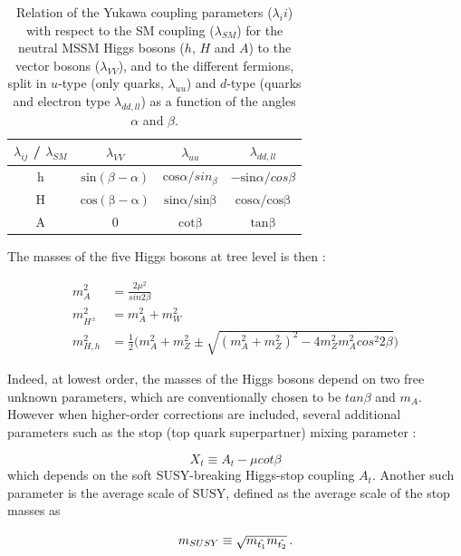 \begin{table}[]
    \centering
    \begin{tabular}{c c c c}
        $\lambda_{ij}$ / $\lambda_{SM}$ & $\lambda_{VV}$ & $\lambda_{uu}$ & $\lambda_{dd,ll}$ \\
        \hline
        h & $\mathrm{sin}(\beta - \alpha)$ & $\mathrm{cos}\alpha/sin_\beta$ & $-\mathrm{sin}\alpha / cos\beta$ \\
        H & $\mathrm{cos(\beta - \alpha)}$ & $\mathrm{sin\alpha / sin\beta}$ & $\mathrm{cos\alpha / cos \beta}$ \\
        A & 0 & $\mathrm{cot\beta}$ & $\mathrm{tan\beta}$ \\
        \hline
    \end{tabular}
    \caption{Relation of the Yukawa coupling parameters ($\lambda_ii$) with respect to the SM coupling ($\lambda_{SM}$) for the neutral MSSM Higgs bosons ($h$, $H$ and $A$) to the vector bosons ($\lambda_{VV}$), and to the different fermions, split in $u$-type (only quarks, $\lambda_{uu}$) and $d$-type (quarks and electron type $\lambda_{dd,ll}$) as a function of the angles $\alpha$ and $\beta$.}
    \label{tab:yukawaMSSM}
\end{table}

The masses of the five Higgs bosons at tree level is then :

\begin{align}
    m_{A}^2 &= \frac{2\mu^2}{sin 2\beta} \\
    m_{H^{\pm}}^2 &= m_{A}^2 + m_{W}^2 \\
    m_{H,h}^2 &= \frac{1}{2} \big( m_A^2 + m_Z^2 \pm \sqrt{(m_A^2 + m_Z^2)^2 - 4m_Z^2 m_A^2 cos^2 2\beta} \big)
\end{align}

Indeed, at lowest order, the masses of the Higgs bosons depend on two free unknown parameters, which are conventionally chosen to be $tan \beta$ and $m_A$. However when higher-order corrections are included, several additional parameters such as the stop (top quark superpartner) mixing parameter :

\begin{equation}
    X_t \equiv A_t - \mu cot\beta
\end{equation}
which depends on the soft SUSY-breaking Higgs-stop coupling $A_t$. Another such parameter is the average scale of SUSY, defined as the average scale of the stop masses as

\begin{equation}
    m_{SUSY} \equiv \sqrt{m_{\Tilde{t_1}}m_{\Tilde{t_2}}} \mend
\end{equation}

